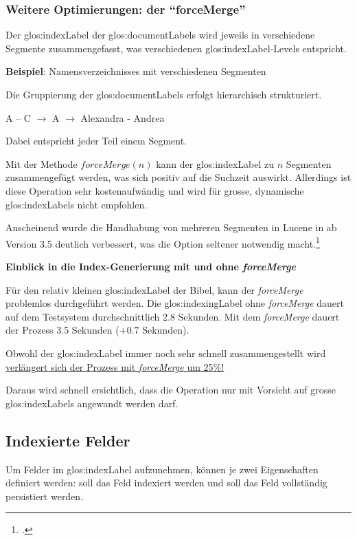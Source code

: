 \subsubsection{Weitere Optimierungen: der "`forceMerge"'}
Der \gls{glos:indexLabel} der \glspl{glos:documentLabel} wird jeweils in verschiedene Segmente zusammengefasst, was verschiedenen \gls{glos:indexLabel}-Levels entspricht.

\begin{framed}
	\textbf{Beispiel}: Namensverzeichnisses mit verschiedenen Segmenten

	Die Gruppierung der \glspl{glos:documentLabel} erfolgt hierarchisch strukturiert.

	A -- C $\rightarrow$ A $\rightarrow$ Alexandra - Andrea

	Dabei entspricht jeder Teil einem Segment.
\end{framed}

Mit der Methode $forceMerge(n)$ kann der \gls{glos:indexLabel} zu $n$ Segmenten zusammengefügt werden, was sich positiv auf die Suchzeit auswirkt. Allerdings ist diese Operation sehr kostenaufwändig und wird für grosse, dynamische \glspl{glos:indexLabel} nicht empfohlen.

Anscheinend wurde die Handhabung von mehreren Segmenten in Lucene in ab Version 3.5 deutlich verbessert, was die Option seltener notwendig macht.\footcite{LUCENE-rename_optimize_to_a_less_cool-sounding_name_ASF_JIRA_2016-05-08}

\begin{framed}
	\textbf{Einblick in die Index-Generierung mit und ohne \textit{forceMerge}}

	Für den relativ kleinen \gls{glos:indexLabel} der Bibel, kann der \textit{forceMerge} problemlos durchgeführt werden.
	Die \gls{glos:indexingLabel} ohne \textit{forceMerge} dauert auf dem Testsystem durchschnittlich 2.8 Sekunden. Mit dem \textit{forceMerge} dauert der Prozess 3.5 Sekunden ($+0.7$ Sekunden).

	Obwohl  der \gls{glos:indexLabel} immer noch sehr schnell zusammengestellt wird \ul{verlängert sich der Prozess mit \textit{forceMerge} um 25\%!}

	Daraus wird schnell ersichtlich, dass die Operation nur mit Vorsicht auf grosse \glspl{glos:indexLabel} angewandt werden darf.
\end{framed}


\subsection{Indexierte Felder}
Um Felder im \gls{glos:indexLabel} aufzunehmen, können je zwei Eigenschaften definiert werden: soll das Feld indexiert werden und soll das Feld vollständig persistiert werden.

